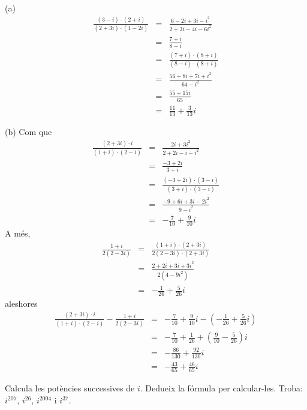 \begin{solucio}
(a)
\begin{eqnarray*}
\frac{(3-i)\cdot (2+i)}{(2+3i)\cdot (1-2i)} &=&\frac{6-2i+3i-i^{2}}{
2+3i-4i-6i^{2}} \\
&=&\frac{7+i}{8-i} \\
&=&\frac{(7+i)\cdot (8+i)}{(8-i)\cdot (8+i)} \\
&=&\frac{56+8i+7i+i^{2}}{64-i^{2}} \\
&=&\frac{55+15i}{65} \\
&=&\frac{11}{13}+\frac{3}{13}i
\end{eqnarray*}

(b) Com que
\begin{eqnarray*}
\frac{(2+3i)\cdot i}{(1+i)\cdot (2-i)} &=&\frac{2i+3i^{2}}{2+2i-i-i^{2}} \\
&=&\frac{-3+2i}{3+i} \\
&=&\frac{(-3+2i)\cdot (3-i)}{(3+i)\cdot (3-i)} \\
&=&\frac{-9+6i+3i-2i^{2}}{9-i^{2}} \\
&=&-\frac{7}{10}+\frac{9}{10}i
\end{eqnarray*}
\medskip
\noindent A més,
\begin{eqnarray*}
\frac{1+i}{2(2-3i)} &=&\frac{(1+i)\cdot (2+3i)}{2(2-3i)\cdot (2+3i)} \\
&=&\frac{2+2i+3i+3i^{2}}{2(4-9i^{2})} \\
&=&-\frac{1}{26}+\frac{5}{26}i
\end{eqnarray*}
aleshores
\begin{eqnarray*}
\frac{(2+3i)\cdot i}{(1+i)\cdot (2-i)}-\frac{1+i}{2(2-3i)} &=&-\frac{7}{10}+
\frac{9}{10}i-\left( -\frac{1}{26}+\frac{5}{26}i\right) \\
&=&-\frac{7}{10}+\frac{1}{26}+\left( \frac{9}{10}-\frac{5}{26}\right) i \\
&=&-\frac{86}{130}+\frac{92}{130}i \\
&=&-\frac{43}{65}+\frac{46}{65}i
\end{eqnarray*}
\end{solucio}

\begin{exemple}
Calcula les potències successives de $i$. Dedueix la fórmula per
calcular-les. Troba: $i^{207}$, $i^{26}$, $i^{2004}$ i $i^{37}$.
\end{exemple}

